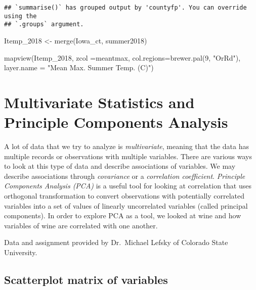 \documentclass[
]{book}
\newenvironment{Shaded}{\begin{snugshade}}{\end{snugshade}}
\newcommand{\AttributeTok}[1]{\textcolor[rgb]{0.77,0.63,0.00}{#1}}
\newcommand{\DecValTok}[1]{\textcolor[rgb]{0.00,0.00,0.81}{#1}}
\newcommand{\FunctionTok}[1]{\textcolor[rgb]{0.00,0.00,0.00}{#1}}
\newcommand{\NormalTok}[1]{#1}
\newcommand{\OtherTok}[1]{\textcolor[rgb]{0.56,0.35,0.01}{#1}}
\newcommand{\StringTok}[1]{\textcolor[rgb]{0.31,0.60,0.02}{#1}}
\begin{document}
\begin{verbatim}
## `summarise()` has grouped output by 'countyfp'. You can override using the
## `.groups` argument.
\end{verbatim}

\begin{Shaded}
\begin{Highlighting}[]
\NormalTok{Itemp\_2018 }\OtherTok{\textless{}{-}} \FunctionTok{merge}\NormalTok{(Iowa\_ct, summer2018)}

\FunctionTok{mapview}\NormalTok{(Itemp\_2018, }\AttributeTok{zcol =}\StringTok{\textquotesingle{}meantmax\textquotesingle{}}\NormalTok{, }\AttributeTok{col.regions=}\FunctionTok{brewer.pal}\NormalTok{(}\DecValTok{9}\NormalTok{, }\StringTok{"OrRd"}\NormalTok{), }\AttributeTok{layer.name =} \StringTok{"Mean Max. Summer Temp. (C)"}\NormalTok{)}
\end{Highlighting}
\end{Shaded}

\hypertarget{multivariate-statistics-and-principle-components-analysis}{%
\chapter{Multivariate Statistics and Principle Components Analysis}\label{multivariate-statistics-and-principle-components-analysis}}

A lot of data that we try to analyze is \emph{multivariate}, meaning that the data has multiple records or observations with multiple variables. There are various ways to look at this type of data and describe associations of variables. We may describe associations through \emph{covariance} or a \emph{correlation coefficient}. \emph{Principle Components Analysis (PCA)} is a useful tool for looking at correlation that uses orthogonal transformation to convert observations with potentially correlated variables into a set of values of linearly uncorrelated variables (called principal components). In order to explore PCA as a tool, we looked at wine and how variables of wine are correlated with one another.

Data and assignment provided by Dr.~Michael Lefsky of Colorado State University.

\hypertarget{scatterplot-matrix-of-variables}{%
\section{Scatterplot matrix of variables}\label{scatterplot-matrix-of-variables}}
\end{document}
